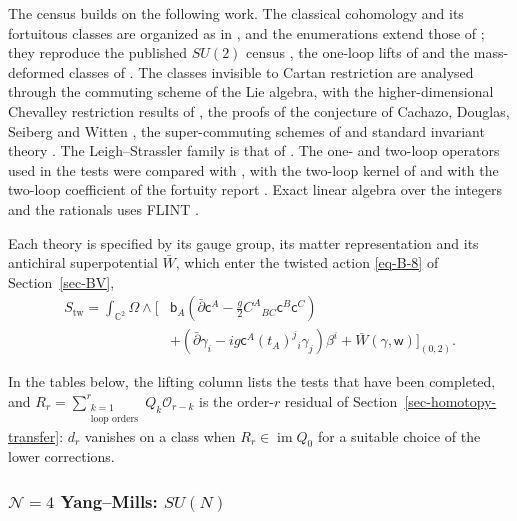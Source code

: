 \documentclass[11pt]{article}
\numberwithin{equation}{section}
\numberwithin{figure}{section}
\numberwithin{table}{section}
\begin{document}
The census builds on the following work. The classical cohomology and its fortuitous classes are organized as in \cite{ChangYin,microstates,ChangLinWords,ChangChevalley}, and the enumerations extend those of \cite{ChangLin,GLRT,KLLS,BraneFused}; they reproduce the published $SU(2)$ census \cite{BPSCounting}, the one-loop lifts of \cite{KonishiBH,KKLP} and the mass-deformed classes of \cite{CK}. The classes invisible to Cartan restriction are analysed through the commuting scheme of the Lie algebra, with the higher-dimensional Chevalley restriction results of \cite{ChenNgo,ChenNgoSp,SXX,Vaccarino,Domokos,Hunziker,Richardson,LNY,SemplinerYang,Goyal}, the proofs of the conjecture of Cachazo, Douglas, Seiberg and Witten \cite{CDSW,EtingofKac,CederwallFerretti,Kumar,WittenSpSO,EtingofII}, the super-commuting schemes of \cite{KvLM} and standard invariant theory \cite{Sergeev,BereleRegev,GoodmanWallach,Bourbaki}. The Leigh--Strassler family is that of \cite{LeighStrassler,BundzikMansson}. The one- and two-loop operators used in the tests were compared with \cite{BK,KKLP}, with the two-loop kernel of \cite[Section 4.5]{GWW} and with the two-loop coefficient of the fortuity report \cite{FortuityAI}. Exact linear algebra over the integers and the rationals uses FLINT \cite{FLINT}.

Each theory is specified by its gauge group, its matter representation and its antichiral superpotential $\bar W$, which enter the twisted action \eqref{eq-B-8} of Section~\ref{sec-BV},
\begin{equation}\label{local-ch9-common-action}
\begin{aligned}
S_{\mathrm{tw}}=\int_{\mathbb C^2}\Omega\wedge\Big[
&\mathsf b_A\left(\bar\partial\mathsf c^A-\frac g2C^A{}_{BC}\mathsf c^B\mathsf c^C\right)\\
&+\left(\bar\partial\gamma_i-ig\mathsf c^A(t_A)^j{}_i\gamma_j\right)\beta^i
+\bar W(\gamma,\mathsf w)\Big]_{(0,2)}.
\end{aligned}
\end{equation}

In the tables below, the lifting column lists the tests that have been completed, and $R_r=\sum_{\substack{k=1\\\text{loop orders}}}^{r}Q_k\mathcal O_{r-k}$ is the order-$r$ residual of Section~\ref{sec-homotopy-transfer}: $d_r$ vanishes on a class when $R_r\in\operatorname{im}Q_0$ for a suitable choice of the lower corrections.

\subsubsection{$\mathcal N=4$ Yang--Mills: $SU(N)$}\label{sec-results-SU}
\end{document}

